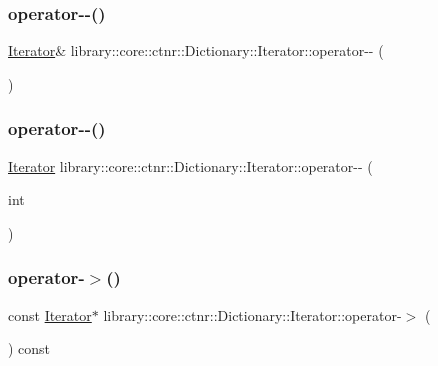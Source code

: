 \subsubsection{\texorpdfstring{operator-\/-\/()}{operator--()}\hspace{0.1cm}{\footnotesize\ttfamily [1/2]}}
{\footnotesize\ttfamily \hyperlink{classlibrary_1_1core_1_1ctnr_1_1_dictionary_1_1_iterator}{Iterator}\& library\+::core\+::ctnr\+::\+Dictionary\+::\+Iterator\+::operator-\/-\/ (\begin{DoxyParamCaption}{ }\end{DoxyParamCaption})}

\mbox{\label{classlibrary_1_1core_1_1ctnr_1_1_dictionary_1_1_iterator_a0e6049d9ccc80f1b0775cd5a3aff1983}} 
\subsubsection{\texorpdfstring{operator-\/-\/()}{operator--()}\hspace{0.1cm}{\footnotesize\ttfamily [2/2]}}
{\footnotesize\ttfamily \hyperlink{classlibrary_1_1core_1_1ctnr_1_1_dictionary_1_1_iterator}{Iterator} library\+::core\+::ctnr\+::\+Dictionary\+::\+Iterator\+::operator-\/-\/ (\begin{DoxyParamCaption}\item[{int}]{ }\end{DoxyParamCaption})}

\mbox{\label{classlibrary_1_1core_1_1ctnr_1_1_dictionary_1_1_iterator_ab0d2327725731d62770ae87f3b5b6003}} 
\subsubsection{\texorpdfstring{operator-\/$>$()}{operator->()}\hspace{0.1cm}{\footnotesize\ttfamily [1/2]}}
{\footnotesize\ttfamily const \hyperlink{classlibrary_1_1core_1_1ctnr_1_1_dictionary_1_1_iterator}{Iterator}$\ast$ library\+::core\+::ctnr\+::\+Dictionary\+::\+Iterator\+::operator-\/$>$ (\begin{DoxyParamCaption}{ }\end{DoxyParamCaption}) const}


